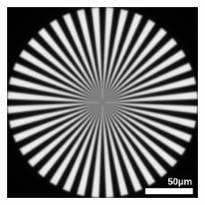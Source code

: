 \documentclass{beamer}
\begin{document}
\begin{frame}
\begin{columns}
\begin{column}{0.5\textwidth}
\begin{figure}
				\includegraphics[width=0.5\textwidth]{images/Spoke-perfect.png}
			\end{figure}
		\end{column}
	\end{columns}
\end{frame}
\end{document}
